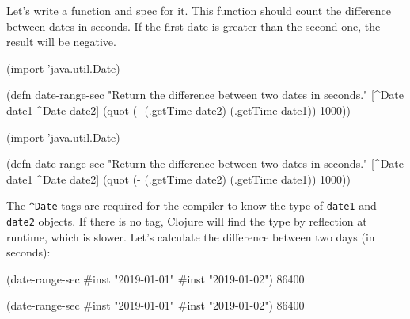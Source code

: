 
Let's write a function and spec for it. This function should count the difference between dates in seconds. If the first date is greater than the second one, the result will be negative.

\ifx\DEVICETYPE\MOBILE

\begin{english}
  \begin{clojure}
(import 'java.util.Date)

(defn date-range-sec
  "Return the difference
           between two dates in seconds."
  [^Date date1 ^Date date2]
  (quot (- (.getTime date2)
           (.getTime date1))
        1000))
  \end{clojure}
\end{english}

\else

\begin{english}
  \begin{clojure}
(import 'java.util.Date)

(defn date-range-sec
  "Return the difference between two dates in seconds."
  [^Date date1 ^Date date2]
  (quot (- (.getTime date2)
           (.getTime date1))
        1000))
  \end{clojure}
\end{english}

\fi

The \verb|^Date| tags are required for the compiler to know the type of \verb|date1| and \verb|date2| objects. If there is no tag, Clojure will find the type by reflection at runtime, which is slower. Let's calculate the difference between two days (in seconds):

\ifx\DEVICETYPE\MOBILE

\begin{english}
  \begin{clojure}
(date-range-sec #inst "2019-01-01"
                #inst "2019-01-02")
86400
  \end{clojure}
\end{english}

\else

\begin{english}
  \begin{clojure}
(date-range-sec #inst "2019-01-01" #inst "2019-01-02")
86400
  \end{clojure}
\end{english}

\fi

